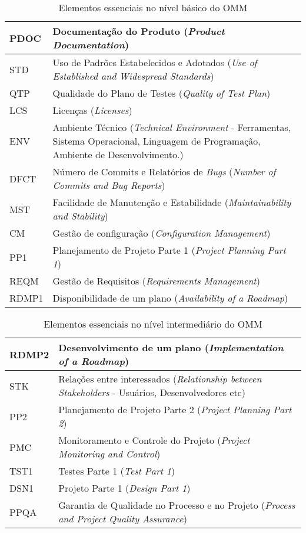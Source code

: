 \begin{table}
  \begin{tabular}{|p{2cm}|p{14cm}|}
    \hline
    PDOC & Documentação do Produto (\textit{Product Documentation}) \\
    \hline
    STD & Uso de Padrões Estabelecidos e Adotados (\textit{Use of
      Established and Widespread Standards}) \\
    \hline
    QTP & Qualidade do Plano de Testes (\textit{Quality of Test Plan})
    \\
    \hline
    LCS & Licenças (\textit{Licenses}) \\
    \hline
    ENV & Ambiente Técnico (\textit{Technical Environment} -
    Ferramentas, Sistema Operacional, Linguagem de Programação,
    Ambiente de Desenvolvimento.) \\
    \hline
    DFCT & Número de Commits e Relatórios de \textit{Bugs}
    (\textit{Number of Commits and Bug Reports}) \\
    \hline
    MST & Facilidade de Manutenção e Estabilidade
    (\textit{Maintainability and Stability}) \\
    \hline
    CM & Gestão de configuração
    (\textit{Configuration Management}) \\
    \hline
    PP1 & Planejamento de Projeto Parte 1
    (\textit{Project Planning Part 1}) \\
    \hline
    REQM & Gestão de Requisitos
    (\textit{Requirements Management}) \\
    \hline
    RDMP1 & Disponibilidade de um plano
    (\textit{Availability of a Roadmap}) \\
    \hline
  \end{tabular}
  \caption{Elementos essenciais no nível básico do OMM}
  \label{tab:omm-basic}
\end{table}

\begin{table}
  \begin{tabular}{|p{2cm}|p{14cm}|}
    \hline
    RDMP2 & Desenvolvimento de um plano
    (\textit{Implementation of a Roadmap}) \\
    \hline
    STK & Relações entre interessados
    (\textit{Relationship between Stakeholders} - Usuários,
    Desenvolvedores etc) \\
    \hline
    PP2 & Planejamento de Projeto Parte 2
    (\textit{Project Planning Part 2}) \\
    \hline
    PMC & Monitoramento e Controle do Projeto
    (\textit{Project Monitoring and Control}) \\
    \hline
    TST1 & Testes Parte 1
    (\textit{Test Part 1}) \\
    \hline
    DSN1 & Projeto Parte 1
    (\textit{Design Part 1}) \\
    \hline
    PPQA & Garantia de Qualidade no Processo e no Projeto
    (\textit{Process and Project Quality Assurance}) \\
    \hline
  \end{tabular}
  \caption{Elementos essenciais no nível intermediário do OMM}
  \label{tab:omm-intermediate}
\end{table}

